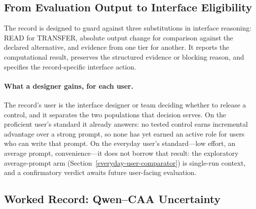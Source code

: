 \documentclass[manuscript,review,anonymous]{acmart}
\begin{document}
\subsection{From Evaluation Output to Interface Eligibility}\label{from-evaluation-output-to-interface-eligibility}

The record is designed to guard against three substitutions in interface reasoning: READ for TRANSFER, absolute output change for comparison against the declared alternative, and evidence from one tier for another. It reports the computational result, preserves the structured evidence or blocking reason, and specifies the record-specific interface action.

\paragraph{What a designer gains, for each user.} The record's user is the interface designer or team deciding whether to release a control, and it separates the two populations that decision serves. On the proficient user's standard it already answers: no tested control earns incremental advantage over a strong prompt, so none has yet earned an active role for users who can write that prompt. On the everyday user's standard---low effort, an average prompt, convenience---it does not borrow that result: the exploratory average-prompt arm (Section~\ref{everyday-user-comparator}) is single-run context, and a confirmatory verdict awaits future user-facing evaluation.

\subsection{Worked Record: Qwen--CAA Uncertainty}\label{worked-record-qwencaa-uncertainty}
\end{document}
